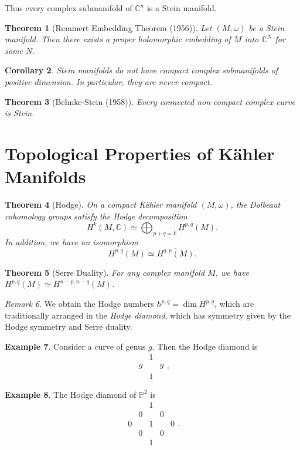 \documentclass[leqno, openany]{memoir}
\newtheorem{thm}{Theorem}[chapter]
\newtheorem{cor}[thm]{Corollary}
\theoremstyle{definition}
\newtheorem{exm}[thm]{Example}
\theoremstyle{remark}
\newtheorem{rmk}[thm]{Remark}
\theoremstyle{plain}
\theoremstyle{definition}
\theoremstyle{remark}
\newcommand{\C}{\mathbb{C}}
\renewcommand{\P}{\mathbb{P}}
\begin{document}
Thus every complex submanifold of $\C^n$ is a Stein manifold.

\begin{thm}[Remmert Embedding Theorem (1956)] Let $(M, \omega)$ be a Stein
manifold. Then there exists a proper holomorphic embedding of $M$ into $\C^N$
for some $N$.  \end{thm}

\begin{cor} Stein manifolds do not have compact complex submanifolds of
positive dimension. In particular, they are never compact.  \end{cor}

\begin{thm}[Behnke-Stein (1958)] Every connected non-compact complex curve is
Stein.  \end{thm}

\section{Topological Properties of K\"ahler Manifolds}%
\label{sec:topological_properties_of_k"ahler_manifolds}

\begin{thm}[Hodge] On a compact K\"ahler manifold $(M, \omega)$, the Dolbeaut
    cohomology groups satisfy the Hodge decomposition \[ H^k(M, \C) \simeq
        \bigoplus_{p+q=k} H^{p,q}(M). \] In addition, we have an isomorphism \[
    H^{p,q}(M) \simeq \overline{H^{q,p}(M)}. \] \end{thm}

\begin{thm}[Serre Duality] For any complex manifold $M$, we have $H^{p,q}(M)
\simeq H^{n-p,n-q}(M)$.  \end{thm}

\begin{rmk} We obtain the Hodge numbers $h^{p,q} = \dim H^{p,q}$, which are
traditionally arranged in the \textit{Hodge diamond}, which has symmetry given
by the Hodge symmetry and Serre duality.  \end{rmk}

\begin{exm} Consider a curve of genus $g$. Then the Hodge diamond is \[
    \begin{array}{ccc} & 1 & \\ g & & g \\ & 1 & \end{array}.\] \end{exm}

\begin{exm} The Hodge diamond of $\P^2$ is \[ \begin{array}{ccccc} & & 1 & & \\
& 0 & & 0 & \\ 0 & & 1 & & 0 \\ & 0 & & 0 & \\ & & 1 & & \end{array}.\]
\end{exm}
\end{document}
